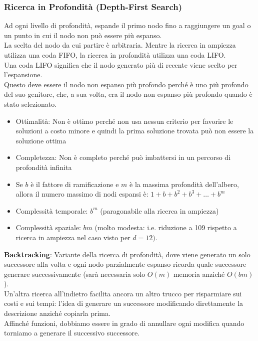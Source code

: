 \documentclass[../main.tex]{subfiles}
\begin{document}
	\subsubsection{Ricerca in Profondità (Depth-First Search)}
	Ad ogni livello di profondità, espande il primo nodo fino a raggiungere un goal o un punto in cui il nodo non può essere più espanso. \\
	La scelta del nodo da cui partire è arbitraria. Mentre la ricerca in ampiezza utilizza una coda FIFO, la ricerca in profondità utilizza una coda LIFO. \\
	Una coda LIFO significa che il nodo generato più di recente viene scelto per l'espansione. \\
	Questo deve essere il nodo non espanso più profondo perché è uno più profondo del suo genitore, che, a sua volta, era il nodo non espanso più profondo quando è stato selezionato.
	\begin{itemize}
		\item Ottimalità: Non è ottimo perché non usa nessun criterio per favorire le soluzioni a costo minore e quindi la prima soluzione trovata può non essere la soluzione ottima
		\item Completezza: Non è completo perché può imbattersi in un percorso di profondità infinita
		\item Se $b$ è il fattore di ramificazione e $m$ è la massima profondità dell'albero, allora il numero massimo di nodi espansi è: $1+b+b^2+b^3+…+b^m$
		\item Complessità temporale: $b^m$ (paragonabile alla ricerca in ampiezza)
		\item Complessità spaziale: $bm$ (molto modesta: i.e. riduzione a 109 rispetto a ricerca in ampiezza nel caso visto per $d=12)$.
	\end{itemize}
	\textbf{Backtracking}: Variante della ricerca di profondità, dove viene generato un solo successore alla volta e ogni nodo parzialmente espanso ricorda quale successore generare successivamente (sarà necessaria solo $O(m)$ memoria anziché $O(bm)$).\\
	Un’altra ricerca all’indietro facilita ancora un altro trucco per risparmiare sui costi e sui tempi: l’idea di generare un successore modificando direttamente la descrizione anziché copiarla prima.\\
	Affinché funzioni, dobbiamo essere in grado di annullare ogni modifica quando torniamo a generare il successivo successore.
\end{document}
